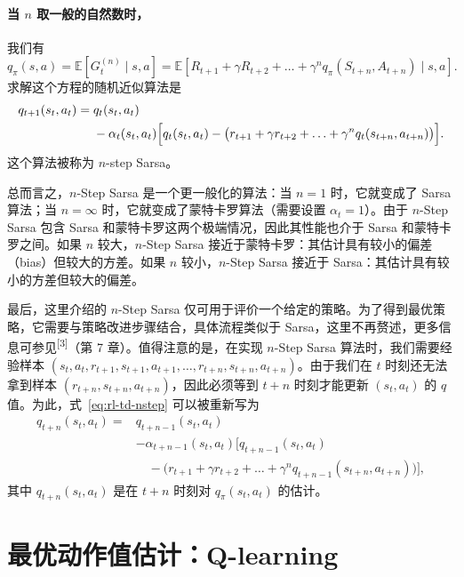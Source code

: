 \paragraph{当 $n$ 取一般的自然数时，} 我们有
\[
  q_{\pi}(s, a) = \mathbb{E}[G_t^{(n)} \mid s, a] = \mathbb{E}[R_{t+1} + \gamma R_{t+2} + \dots + \gamma^n q_{\pi}(S_{t+n}, A_{t+n}) \mid s, a].
\]
求解这个方程的随机近似算法是
\begin{align}
  q_{t+1}(s_t, a_t) ={}& q_t(s_t, a_t) \notag \\
  & - \alpha_t(s_t, a_t) \Big[ q_t(s_t, a_t) - \big( r_{t+1} + \gamma r_{t+2} + \ldots + \gamma^n q_t(s_{t+n}, a_{t+n}) \big) \Big].
  \label{eq:rl-td-nstep}
\end{align}
这个算法被称为 $n$-step Sarsa。

总而言之，$n$-Step Sarsa 是一个更一般化的算法：当 $n = 1$ 时，它就变成了 Sarsa 算法；当 $n = \infty$ 时，它就变成了蒙特卡罗算法（需要设置 $\alpha_t = 1$）。由于 $n$-Step Sarsa 包含 Sarsa 和蒙特卡罗这两个极端情况，因此其性能也介于 Sarsa 和蒙特卡罗之间。如果 $n$ 较大，$n$-Step Sarsa 接近于蒙特卡罗：其估计具有较小的偏差（bias）但较大的方差。如果 $n$ 较小，$n$-Step Sarsa 接近于 Sarsa：其估计具有较小的方差但较大的偏差。

最后，这里介绍的 $n$-Step Sarsa 仅可用于评价一个给定的策略。为了得到最优策略，它需要与策略改进步骤结合，具体流程类似于 Sarsa，这里不再赘述，更多信息可参见\textsuperscript{[3]}（第 7 章）。值得注意的是，在实现 $n$-Step Sarsa 算法时，我们需要经验样本 $(s_t, a_t, r_{t+1}, s_{t+1}, a_{t+1}, \ldots, r_{t+n}, s_{t+n}, a_{t+n})$。由于我们在 $t$ 时刻还无法拿到样本 $(r_{t+n}, s_{t+n}, a_{t+n})$，因此必须等到 $t+n$ 时刻才能更新 $(s_t, a_t)$ 的 $q$ 值。为此，式~\eqref{eq:rl-td-nstep} 可以被重新写为
\begin{align*}
  q_{t+n}(s_t, a_t) ={}& q_{t+n-1}(s_t, a_t) \\
  & - \alpha_{t+n-1}(s_t, a_t) \Big[ q_{t+n-1}(s_t, a_t) \\
  & \quad - \big( r_{t+1} + \gamma r_{t+2} + \ldots + \gamma^n q_{t+n-1}(s_{t+n}, a_{t+n}) \big) \Big],
\end{align*}
其中 $q_{t+n}(s_t, a_t)$ 是在 $t+n$ 时刻对 $q_{\pi}(s_t, a_t)$ 的估计。

\section{最优动作值估计：Q-learning}
\label{sec:rl-td-qlearning}

